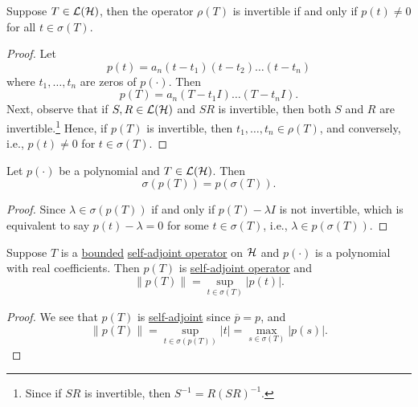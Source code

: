\begin{lemma}
	Suppose \(T\in \mathcal{\MakeUppercase{l}} (\mathcal{\MakeUppercase{h}} )\), then the operator \(\rho (T)\) is invertible if and only if \(p(t) \neq 0\) for all \(t\in \sigma (T)\).
\end{lemma}
\begin{proof}
	Let
	\[
		p(t) = a_n (t-t_1)(t-t_2)\ldots  (t-t_n)
	\]
	where \(t_1, \ldots  , t_n\) are zeros of \(p(\cdot)\). Then
	\[
		p(T) = a_n (T-t_1 I)\ldots  (T-t_n I).
	\]
	Next, observe that if \(S, R\in \mathcal{\MakeUppercase{l}} (\mathcal{\MakeUppercase{h}} )\) and \(SR\) is invertible, then both \(S\) and \(R\) are invertible.\footnote{Since if \(SR\) is invertible, then \(S^{-1} = R(SR)^{-1} \).} Hence, if \(p(T)\) is invertible, then \(t_1, \ldots  , t_n\in \rho (T)\), and conversely, i.e., \(p(t) \neq 0\) for \(t\in \sigma (T)\).
\end{proof}

\begin{proposition}
	Let \(p(\cdot)\) be a polynomial and \(T\in \mathcal{\MakeUppercase{l}} (\mathcal{\MakeUppercase{h}} )\). Then
	\[
		\sigma (p(T)) = p(\sigma (T)).
	\]
\end{proposition}
\begin{proof}
	Since \(\lambda \in \sigma (p(T))\) if and only if \(p(T) - \lambda I\) is not invertible, which is equivalent to say \(p(t) - \lambda = 0\) for some \(t\in \sigma (T)\), i.e., \(\lambda \in p(\sigma (T))\).
\end{proof}

\begin{corollary}
	Suppose \(T\) is a \hyperref[rmk:bounded-op]{bounded} \hyperref[def:self-adjoint-op]{self-adjoint operator} on \(\mathcal{\MakeUppercase{h}} \) and \(p(\cdot)\) is a polynomial with real coefficients. Then \(p(T)\) is \hyperref[def:self-adjoint-op]{self-adjoint operator} and
	\[
		\lVert p(T) \rVert = \sup _{t\in \sigma (T)}\vert p(t) \vert.
	\]
\end{corollary}
\begin{proof}
	We see that \(p(T)\) is \hyperref[def:self-adjoint-op]{self-adjoint} since \(\overline{p} = p\), and
	\[
		\lVert p(T) \rVert = \sup _{t\in \sigma (p(T))} \vert t \vert = \max _{s\in \sigma (T)} \vert p(s) \vert .
	\]
\end{proof}
